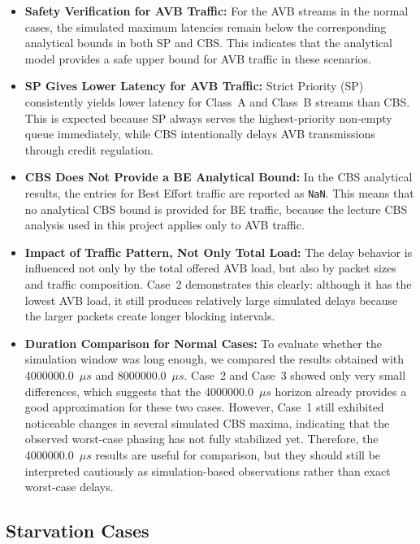 \begin{itemize}
\item \textbf{Safety Verification for AVB Traffic:}
For the AVB streams in the normal cases, the simulated maximum latencies remain below the corresponding analytical bounds in both SP and CBS. This indicates that the analytical model provides a safe upper bound for AVB traffic in these scenarios.

\item \textbf{SP Gives Lower Latency for AVB Traffic:}
Strict Priority (SP) consistently yields lower latency for Class~A and Class~B streams than CBS. This is expected because SP always serves the highest-priority non-empty queue immediately, while CBS intentionally delays AVB transmissions through credit regulation.

\item \textbf{CBS Does Not Provide a BE Analytical Bound:}
In the CBS analytical results, the entries for Best Effort traffic are reported as \texttt{NaN}. This means that no analytical CBS bound is provided for BE traffic, because the lecture CBS analysis used in this project applies only to AVB traffic.

\item \textbf{Impact of Traffic Pattern, Not Only Total Load:}
The delay behavior is influenced not only by the total offered AVB load, but also by packet sizes and traffic composition. Case~2 demonstrates this clearly: although it has the lowest AVB load, it still produces relatively large simulated delays because the larger packets create longer blocking intervals.

\item \textbf{Duration Comparison for Normal Cases:}
To evaluate whether the simulation window was long enough, we compared the results obtained with 4000000.0~$\mu s$ and 8000000.0~$\mu s$. Case~2 and Case~3 showed only very small differences, which suggests that the 4000000.0~$\mu s$ horizon already provides a good approximation for these two cases. However, Case~1 still exhibited noticeable changes in several simulated CBS maxima, indicating that the observed worst-case phasing has not fully stabilized yet. Therefore, the 4000000.0~$\mu s$ results are useful for comparison, but they should still be interpreted cautiously as simulation-based observations rather than exact worst-case delays.
\end{itemize}

\subsection{Starvation Cases}

